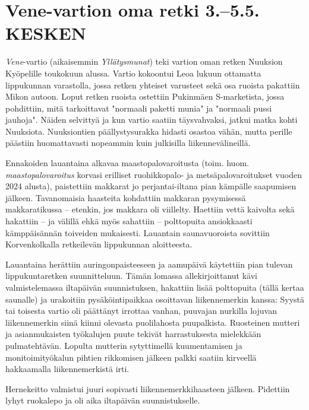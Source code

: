 
\section{Vene-vartion oma retki 3.–5.5. KESKEN}



\begin{multicols}{2}

\noindent \textit{Vene}-vartio (aikaisemmin \mbox{\textit{Yllätysmunat}}) teki vartion oman retken Nuuksion Kyöpelille toukokuun alussa. Vartio kokoontui Leoa lukuun ottamatta lippukunnan varastolla, jossa retken yhteiset varusteet sekä osa ruoista pakattiin Mikon autoon. Loput retken ruoista ostettiin Pukinmäen S-marketista, jossa pohdittiin, mitä tarkoittavat "normaali paketti munia" ja "normaali pussi jauhoja". Näiden selvittyä ja kun vartio saatiin täysvahvaksi, jatkui matka kohti Nuuksiota. Nuuksiontien päällystysurakka hidasti osastoa vähän, mutta perille päästiin huomattavasti nopeammin kuin julkisilla liikennevälineillä.

Ennakoiden lauantaina alkavaa maastopalovaroitusta (toim. huom. \textit{maastopalovaroitus} korvasi erilliset ruohikkopalo- ja metsäpalovaroitukset vuoden 2024 alusta), paistettiin makkarat jo perjantai-iltana pian kämpälle saapumisen jälkeen. Tavanomaisia haasteita kohdattiin makkaran pysymisessä makkaratikussa – etenkin, jos makkara oli viillelty. Haettiin vettä kaivolta sekä hakattiin – ja välillä ehkä myös sahattiin – polttopuita ansiokkaasti kämppäisännän toiveiden mukaisesti. Lauantain saunavuoroista sovittiin Korvenkolkalla retkeilevän lippukunnan aloitteesta.

Lauantaina herättiin auringonpaisteeseen ja aamupäivä käytettiin pian tulevan lippukuntaretken suunnitteluun. Tämän lomassa allekirjoittanut kävi valmistelemassa iltapäivän suunnistuksen, hakattiin lisää polttopuita (tällä kertaa saunalle) ja urakoitiin pysäköintipaikkaa osoittavan liikennemerkin kanssa: Syystä tai toisesta vartio oli päättänyt irrottaa vanhan, puuvajan nurkilla lojuvan liikennemerkin siinä kiinni olevasta puolilahosta puupalkista. Ruosteinen mutteri ja asianmukaisten työkalujen puute tekivät harrastuksesta mielekkään pulmatehtävän. Lopulta mutterin sytyttimellä kuumentamisen ja monitoimityökalun pihtien rikkomisen jälkeen palkki saatiin kirveellä hakkaamalla liikennemerkistä irti.

Hernekeitto valmistui juuri sopivasti liikennemerkkihaasteen jälkeen. Pidettiin lyhyt ruokalepo ja oli aika iltapäivän suunnistukselle.


\end{multicols}
